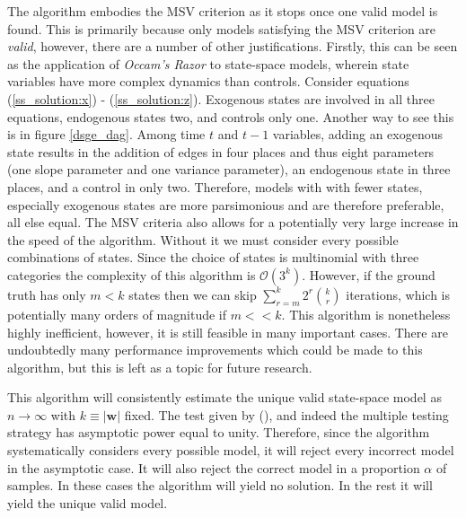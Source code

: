 \documentclass{article}
\begin{document}
The algorithm embodies the MSV criterion as it stops once one valid model is found. This is primarily because only models satisfying the MSV criterion are \textit{valid}, however, there are a number of other justifications. Firstly, this can be seen as the application of \textit{Occam's Razor} to state-space models, wherein state variables have more complex dynamics than controls. Consider equations (\ref{ss_solution:x}) - (\ref{ss_solution:z}). Exogenous states are involved in all three equations, endogenous states two, and controls only one. Another way to see this is in figure \ref{dsge_dag}. Among time $t$ and $t-1$ variables, adding an exogenous state results in the addition of edges in four places and thus eight parameters (one slope parameter and one variance parameter), an endogenous state in three places, and a control in only two. Therefore, models with with fewer states, especially exogenous states are more parsimonious and are therefore preferable, all else equal. The MSV criteria also allows for a potentially very large increase in the speed of the algorithm. Without it we must consider every possible combinations of states. Since the choice of states is multinomial with three categories the complexity of this algorithm is $\mathcal{O}(3^k)$. However, if the ground truth has only $m < k$ states then we can skip $\sum_{r=m}^{k} 2^r {\binom{k}{r}}$ iterations, which is potentially many orders of magnitude if $m << k$. This algorithm is nonetheless highly inefficient, however, it is still feasible in many important cases. There are undoubtedly many performance improvements which could be made to this algorithm, but this is left as a topic for future research.

This algorithm will consistently estimate the unique valid state-space model as $n \rightarrow \infty$ with $k \equiv |\mathbf{w}|$ fixed. The test given by \citeauthor{srivastava2005some} (\citeyear{srivastava2005some}), and indeed the multiple testing strategy has asymptotic power equal to unity. Therefore, since the algorithm systematically considers every possible model, it will reject every incorrect model in the asymptotic case. It will also reject the correct model in a proportion $\alpha$ of samples. In these cases the algorithm will yield no solution. In the rest it will yield the unique valid model. 
\end{document}
